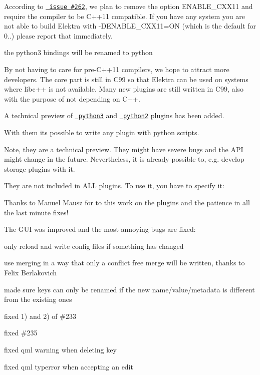 \begin{DoxyItemize}
\item According to \href{https://git.libelektra.org/issues/262}{\texttt{ issue \#262}}, we plan to remove the option E\+N\+A\+B\+L\+E\+\_\+\+C\+X\+X11 and require the compiler to be C++11 compatible. If you have any system you are not able to build Elektra with -\/D\+E\+N\+A\+B\+L\+E\+\_\+\+C\+X\+X11=ON (which is the default for 0..) please report that immediately.
\item the python3 bindings will be renamed to python
\end{DoxyItemize}

By not having to care for pre-\/\+C++11 compilers, we hope to attract more developers. The core part is still in C99 so that Elektra can be used on systems where libc++ is not available. Many new plugins are still written in C99, also with the purpose of not depending on C++.

A technical preview of \href{https://git.libelektra.org/blob/master/src/plugins/python}{\texttt{ python3}} and \href{https://git.libelektra.org/blob/master/src/plugins/python2}{\texttt{ python2}} plugins has been added.

With them its possible to write any plugin with python scripts.

Note, they are a technical preview. They might have severe bugs and the A\+PI might change in the future. Nevertheless, it is already possible to, e.\+g. develop storage plugins with it.

They are not included in {\ttfamily A\+LL} plugins. To use it, you have to specify it\+:


\begin{DoxyCode}{0}
\end{DoxyCode}


Thanks to Manuel Mausz for to this work on the plugins and the patience in all the last minute fixes!

The G\+UI was improved and the most annoying bugs are fixed\+:


\begin{DoxyItemize}
\item only reload and write config files if something has changed
\item use merging in a way that only a conflict free merge will be written, thanks to Felix Berlakovich
\item made sure keys can only be renamed if the new name/value/metadata is different from the existing ones
\item fixed 1) and 2) of \#233
\item fixed \#235
\item fixed qml warning when deleting key
\item fixed qml typerror when accepting an edit
\end{DoxyItemize}

